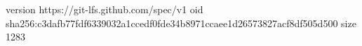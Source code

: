 version https://git-lfs.github.com/spec/v1
oid sha256:c3dafb77fdf6339032a1ccedf0fde34b8971ccaee1d26573827acf8df505d500
size 1283
